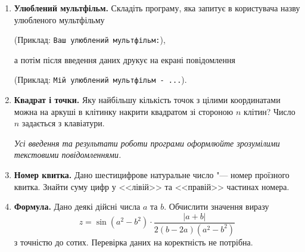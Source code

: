 \begin{enumerate}

\item \textbf{Улюблений мультфільм.} Складіть програму, яка запитує в користувача назву улюбленого мультфільму

(Приклад: \verb|Ваш улюблений мультфільм:|),

а потім після введення даних друкує на екрані повідомлення

(Приклад: \verb|Мій улюблений мультфільм - ...|).

\item \textbf{Квадрат і точки.} Яку найбільшу кількість точок з цілими координатами можна на аркуші в клітинку накрити квадратом зі стороною $n$ клітин? Число $n$ задається з клавіатури.

{\itshape Усі введення та результати роботи програми оформлюйте зрозумілими текстовими повідомленнями.}

\item \textbf{Номер квитка.} Дано шестицифрове натуральне число "--- номер проїзного квитка. Знайти суму цифр у <<лівій>> та <<правій>> частинах номера.

\item \textbf{Формула.} Дано деякі дійсні числа $a$ та $b$. Обчислити значення виразу
$$
z=\sin(a^2-b^2)\cdot\dfrac{|a+b|}{2(b-2a)(a^2-b^2)}
$$
з точністю до сотих. Перевірка даних на коректність не потрібна.
\end{enumerate}






